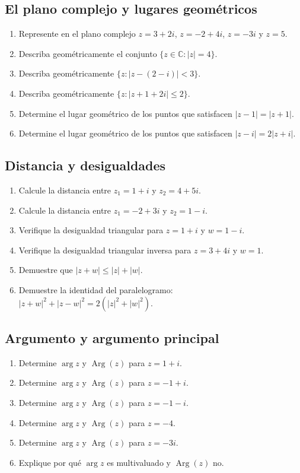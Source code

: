 \subsection{El plano complejo y lugares geométricos}
\begin{enumerate}
\item Represente en el plano complejo $z=3+2i$, $z=-2+4i$, $z=-3i$ y $z=5$.
\item Describa geométricamente el conjunto $\{z\in\mathbb{C}: |z|=4\}$.
\item Describa geométricamente $\{z: |z-(2-i)|<3\}$.
\item Describa geométricamente $\{z: |z+1+2i|\le 2\}$.
\item Determine el lugar geométrico de los puntos que satisfacen $|z-1|=|z+1|$.
\item Determine el lugar geométrico de los puntos que satisfacen $|z-i|=2|z+i|$.
\end{enumerate}

\subsection{Distancia y desigualdades}
\begin{enumerate}
\item Calcule la distancia entre $z_1=1+i$ y $z_2=4+5i$.
\item Calcule la distancia entre $z_1=-2+3i$ y $z_2=1-i$.
\item Verifique la desigualdad triangular para $z=1+i$ y $w=1-i$.
\item Verifique la desigualdad triangular inversa para $z=3+4i$ y $w=1$.
\item Demuestre que $|z+w|\le |z|+|w|$.
\item Demuestre la identidad del paralelogramo: $|z+w|^2+|z-w|^2=2(|z|^2+|w|^2)$.
\end{enumerate}

\subsection{Argumento y argumento principal}
\begin{enumerate}
\item Determine $\arg z$ y $\operatorname{Arg}(z)$ para $z=1+i$.
\item Determine $\arg z$ y $\operatorname{Arg}(z)$ para $z=-1+i$.
\item Determine $\arg z$ y $\operatorname{Arg}(z)$ para $z=-1-i$.
\item Determine $\arg z$ y $\operatorname{Arg}(z)$ para $z=-4$.
\item Determine $\arg z$ y $\operatorname{Arg}(z)$ para $z=-3i$.
\item Explique por qué $\arg z$ es multivaluado y $\operatorname{Arg}(z)$ no.
\end{enumerate}

